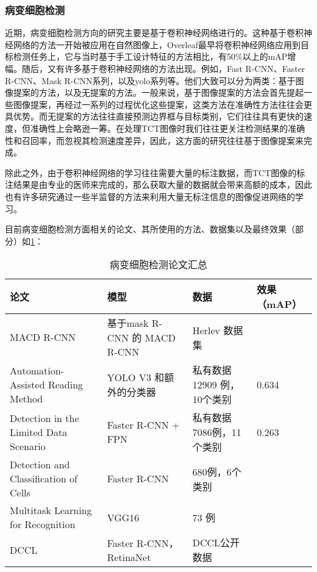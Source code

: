 \subsubsection{病变细胞检测}
\par 近期，病变细胞检测方向的研究主要是基于卷积神经网络进行的。这种基于卷积神经网络的方法一开始被应用在自然图像上，Overleaf\cite{sermanet2013overfeat}最早将卷积神经网络应用到目标检测任务上，它与当时基于手工设计特征的方法相比，有50\%以上的mAP增幅。随后，又有许多基于卷积神经网络的方法出现。例如，Fast R-CNN\cite{girshick2015fast}、Faster R-CNN\cite{ren2015faster}、Mask R-CNN\cite{he2017mask}系列，以及yolo系列\cite{redmon2016you}\cite{redmon2017yolo9000}等。他们大致可以分为两类：基于图像提案的方法\cite{ren2015faster}\cite{girshick2015fast}，以及无提案的方法\cite{redmon2016you}\cite{redmon2017yolo9000}。一般来说，基于图像提案的方法会首先提起一些图像提案，再经过一系列的过程优化这些提案，这类方法在准确性方法往往会更具优势。而无提案的方法往往直接预测边界框与目标类别，它们往往具有更快的速度，但准确性上会略逊一筹。在处理TCT图像时我们往往更关注检测结果的准确性和召回率，而忽视其检测速度差异，因此，这方面的研究往往基于图像提案来完成。
\par 除此之外，由于卷积神经网络的学习往往需要大量的标注数据，而TCT图像的标注结果是由专业的医师来完成的，那么获取大量的数据就会带来高额的成本，因此也有许多研究\cite{ou2020semi}通过一些半监督的方法来利用大量无标注信息的图像促进网络的学习。
\par 目前病变细胞检测方面相关的论文、其所使用的方法、数据集以及最终效果（部分）如\ref{检测论文}：
\begin{table}[htbp]
    \center
    \tiny
    \caption{病变细胞检测论文汇总}
    \begin{tabular}{p{120pt}p{100pt}p{85pt}p{35pt}}
        \hline
        论文                                                             & 模型                         & 数据                       & 效果（mAP） \\
        \hline
        MACD R-CNN\cite{ma2020macd}                                      & 基于mask R-CNN 的 MACD R-CNN & Herlev 数据集              &             \\
        Automation-Assisted Reading Method\cite{xiang2020novel}          & YOLO V3 和额外的分类器       & 私有数据12909 例，10个类别 & 0.634       \\
        Detection in the Limited Data Scenario\cite{liang2018comparison} & Faster R-CNN + FPN           & 私有数据7086例，11个类别   & 0.263       \\
        Detection and Classification of Cells\cite{li2019detection}      & Faster R-CNN                 & 680例，6个类别             &             \\
        Multitask Learning for Recognition\cite{liu2018multitask}        & VGG16                        & 73 例                      &             \\
        DCCL\cite{zhang2019dccl}                                         & Faster R-CNN，RetinaNet      & DCCL公开数据               &             \\
        \hline
    \end{tabular}
    \label{检测论文}
\end{table}

